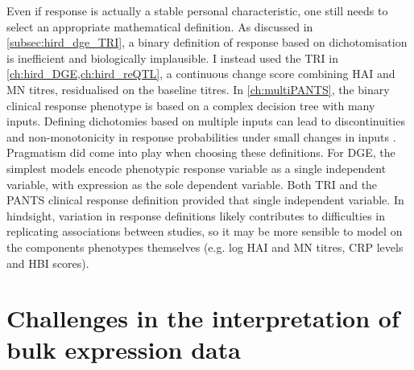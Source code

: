 Even if response is actually a stable personal characteristic, one still needs to select an appropriate mathematical definition.
As discussed in \cref{subsec:hird_dge_TRI}, a binary definition of response based on dichotomisation is inefficient and biologically implausible.
I instead used the \gls{TRI} in \cref{ch:hird_DGE,ch:hird_reQTL}, a continuous change score combining \gls{HAI} and \gls{MN} titres, residualised on the baseline titres.
In \cref{ch:multiPANTS}, the binary clinical response phenotype is based on a complex decision tree with many inputs.
Defining dichotomies based on multiple inputs can lead to discontinuities and non-monotonicity in response probabilities under small changes in inputs \autocite{senn2005DichotomaniaObsessiveCompulsive}.
Pragmatism did come into play when choosing these definitions.
For \gls{DGE}, the simplest models encode phenotypic response variable as a single independent variable, with expression as the sole dependent variable.
Both \gls{TRI} and the \gls{PANTS} clinical response definition provided that single independent variable.
In hindsight, variation in response definitions likely contributes to difficulties in replicating associations between studies,
so it may be more sensible to model on the components phenotypes themselves (e.g. log \gls{HAI} and \gls{MN} titres, \gls{CRP} levels and \gls{HBI} scores).


\section{Challenges in the interpretation of bulk expression data}

